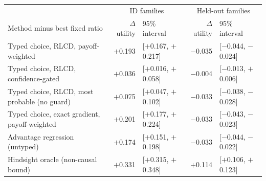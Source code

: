 \begin{tabular}{lrlrl}
\toprule
 & \multicolumn{2}{c}{ID families} & \multicolumn{2}{c}{Held-out families} \\
Method minus best fixed ratio & $\Delta$ utility & 95\% interval & $\Delta$ utility & 95\% interval \\
\midrule
Typed choice, RLCD, payoff-weighted & $+$0.193 & [$+$0.167, $+$0.217] & $-$0.035 & [$-$0.044, $-$0.024] \\
Typed choice, RLCD, confidence-gated & $+$0.036 & [$+$0.016, $+$0.058] & $-$0.004 & [$-$0.013, $+$0.006] \\
Typed choice, RLCD, most probable (no guard) & $+$0.075 & [$+$0.047, $+$0.102] & $-$0.033 & [$-$0.038, $-$0.028] \\
Typed choice, exact gradient, payoff-weighted & $+$0.201 & [$+$0.177, $+$0.224] & $-$0.033 & [$-$0.043, $-$0.023] \\
Advantage regression (untyped) & $+$0.174 & [$+$0.151, $+$0.198] & $-$0.033 & [$-$0.044, $-$0.022] \\
Hindsight oracle (non-causal bound) & $+$0.331 & [$+$0.315, $+$0.348] & $+$0.114 & [$+$0.106, $+$0.123] \\
\bottomrule
\end{tabular}
